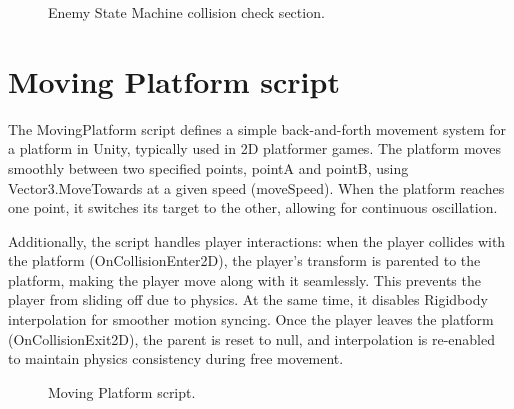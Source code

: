 \documentclass[12pt,oneside,openright,a4paper]{cpe-english-project}
\begin{document}
 \begin{figure}[!h]
 \centering
\caption{Enemy State Machine collision check section.}\label{fig:ESMcolli}
\end{figure}
\newpage
\section{Moving Platform script}
The MovingPlatform script defines a simple back-and-forth movement system for a platform in Unity, typically used in 2D platformer games. The platform moves smoothly between two specified points, pointA and pointB, using Vector3.MoveTowards at a given speed (moveSpeed). When the platform reaches one point, it switches its target to the other, allowing for continuous oscillation.\par
Additionally, the script handles player interactions: when the player collides with the platform (OnCollisionEnter2D), the player’s transform is parented to the platform, making the player move along with it seamlessly. This prevents the player from sliding off due to physics. At the same time, it disables Rigidbody interpolation for smoother motion syncing. Once the player leaves the platform (OnCollisionExit2D), the parent is reset to null, and interpolation is re-enabled to maintain physics consistency during free movement.\par
 \begin{figure}[!h]
 \centering
\caption{Moving Platform script.}\label{fig:movplat}
\end{figure}
\newpage



\end{document}
